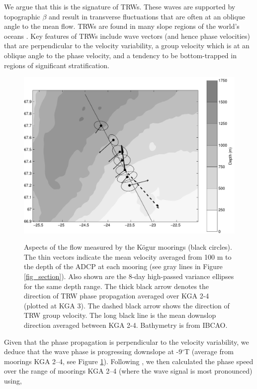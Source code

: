 \documentclass[12pt,titlepage,figuresatend]{article}
\begin{document}
We argue that this is the signature of TRWs. These waves are supported by topographic $\beta$ and result in transverse fluctuations that are often at an oblique angle to the mean flow. TRWs are found in many slope regions of the world’s oceans \cite[]{Garrett1979,Louis1982,Pickart1990}. Key features of TRWs include wave vectors (and hence phase velocities) that are perpendicular to the velocity variability, a group velocity which is at an oblique angle to the phase velocity, and a tendency to be bottom-trapped in regions of significant stratification.

\begin{figure}[ht!]
  \centering\includegraphics[width=\hsize]{./figures/map_ellipse.pdf}
  \caption{Aspects of the flow measured by the K\"{o}gur moorings (black circles). The thin vectors indicate the
  mean velocity averaged from 100 m to the depth of the ADCP at each mooring (see gray lines in Figure \ref{fig_section}). Also shown are the 8-day high-passed variance ellipses for the same depth range. The thick black arrow denotes the direction of TRW phase propagation averaged over KGA 2-4 (plotted at KGA 3). The dashed black arrow shows the direction of TRW group velocity. The long black line is the mean downslop direction averaged between KGA 2-4. Bathymetry is from IBCAO.}{\label{fig_ellipse}}
\end{figure}

Given that the phase propagation is perpendicular to the velocity variability, we deduce that the wave phase is progressing downslope at -9$^{\circ}$T (average from moorings KGA 2--4, see Figure \ref{fig_ellipse}). Following \cite{Pickart1990}, we then calculated the phase speed over the range of moorings KGA 2--4 (where the wave signal is most pronounced) using,
\end{document}
